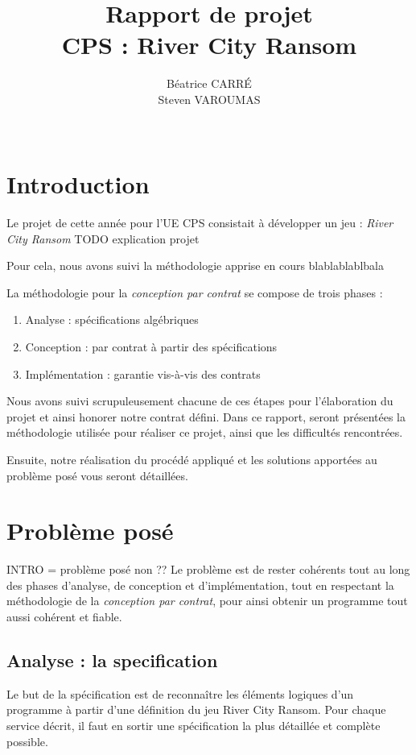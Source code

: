 \documentclass[a4paper, 11pt, notitlepage]{article}
\title{
  \huge Rapport de projet \\
  \huge CPS : River City Ransom\\
}
\author{
  Béatrice CARR\'E \\
  Steven VAROUMAS \\
  \\
}
\begin{document}
\maketitle
\section*{Introduction}


Le projet de cette année pour l'UE CPS  consistait à développer un jeu : \emph{River City Ransom}
TODO explication projet

Pour cela, nous avons suivi la méthodologie apprise en cours blablablablbala

La méthodologie pour la \emph{conception par contrat}  se compose de trois phases :
\begin{enumerate}
\item Analyse : spécifications algébriques 
\item Conception : par contrat à partir des spécifications
\item Implémentation : garantie vis-à-vis des contrats
\end{enumerate}
Nous avons suivi scrupuleusement chacune de ces étapes pour l'élaboration du
projet et ainsi honorer notre contrat défini. 
Dans ce rapport, seront présentées la méthodologie utilisée pour
réaliser ce projet, ainsi que les difficultés rencontrées.
 
Ensuite, notre réalisation du procédé appliqué
et les solutions apportées au problème posé vous seront détaillées.







\section{Problème posé}

INTRO = problème posé non ?? 
Le problème est de rester cohérents tout au long des phases d'analyse,
de conception et d'implémentation, tout en respectant la méthodologie de la \emph{conception par contrat},
pour ainsi obtenir un programme tout aussi cohérent et fiable.

\subsection{Analyse : la specification}
Le but de la spécification est de reconnaître les éléments logiques
d’un programme à partir d’une définition du jeu River City Ransom.
Pour chaque service décrit, il faut en sortir une spécification la
plus détaillée et complète possible.
\end{document}
